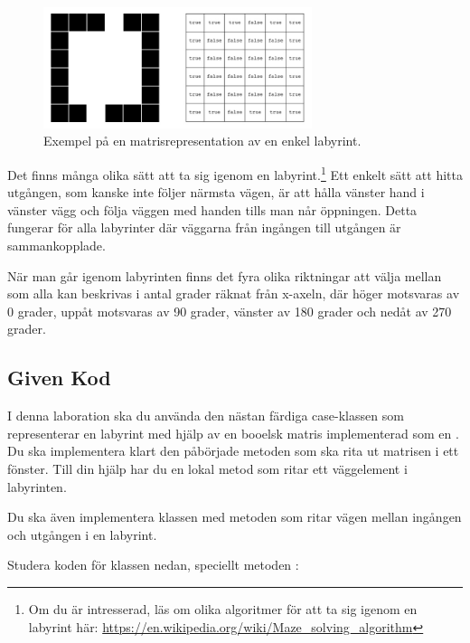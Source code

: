 \begin{figure}[h]
	\begin{center}
		\includegraphics[width=0.7\textwidth]{../img/w09-lab/MazeAndMatrix.jpg}
	\end{center}
	\caption{Exempel på en matrisrepresentation av en enkel labyrint.}
	\label{maze:figboolmatrix}
\end{figure}

Det finns många olika sätt att ta sig igenom en labyrint.\footnote{Om du är intresserad, läs om olika algoritmer för att ta sig igenom en labyrint här: \url{https://en.wikipedia.org/wiki/Maze\_solving\_algorithm}} Ett enkelt sätt att hitta utgången, som kanske inte följer närmsta vägen, är att hålla vänster hand i vänster vägg och följa väggen med handen tills man når öppningen. Detta fungerar för alla labyrinter där väggarna från ingången till utgången är sammankopplade.

När man går igenom labyrinten finns det fyra olika riktningar att välja mellan som alla kan beskrivas i antal grader räknat från x-axeln, där höger motsvaras av 0 grader, uppåt motsvaras av 90 grader, vänster av 180 grader och nedåt av 270 grader.

\subsection{Given Kod}

I denna laboration ska du använda den nästan färdiga case-klassen  som representerar en labyrint med hjälp av en booelsk matris implementerad som en .
Du ska implementera klart den påbörjade metoden  som ska rita ut matrisen i ett fönster. Till din hjälp har du en lokal metod som ritar ett väggelement i labyrinten.

Du ska även implementera klassen  med metoden  som ritar vägen mellan ingången och utgången i en labyrint.

Studera koden för klassen  nedan, speciellt metoden :

